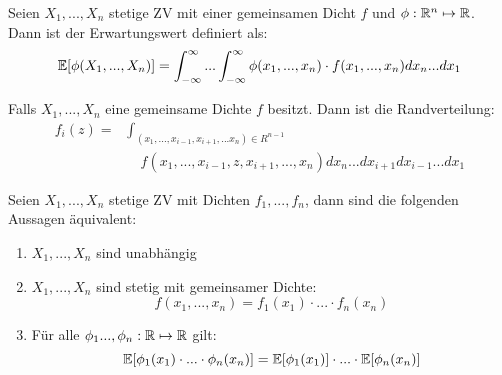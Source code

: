 \begin{subbox}{} Seien $X_1,...,X_n$ stetige ZV mit einer gemeinsamen Dicht $f$ und $\phi: \mathbb{R}^n \mapsto \mathbb{R}$. Dann ist der Erwartungswert definiert als:
$$\mathbb{E}[\phi(X_1, ..., X_n)] = \int_{-\infty}^\infty ... \int_{-\infty}^\infty \phi(x_1, ...,x_n) \cdot f(x_1,...,x_n) dx_n...dx_1$$
\end{subbox}
\begin{subbox}{} Falls $X_1,...,X_n$ eine gemeinsame Dichte $f$ besitzt. Dann ist die Randverteilung:
\begin{align*}
    f_i(z) =& \int_{(x_1, ..., x_{i-1},x_{i+1},...x_n) \in R^{n-1}} \\ 
    & \quad f(x_1,...,x_{i-1},z,x_{i+1},...,x_n)dx_n...dx_{i+1}dx_{i-1}...dx_1
\end{align*}
\end{subbox}
\begin{subbox}{} Seien $X_1,...,X_n$ stetige ZV mit Dichten $f_1,..., f_n$, dann sind die folgenden Aussagen äquivalent:
\begin{enumerate}
    \item $X_1,...,X_n$ sind unabhängig
    
    \item $X_1,...,X_n$ sind stetig mit gemeinsamer Dichte: 
    $$f(x_1,...,x_n) = f_1(x_1) \cdot ... \cdot f_n(x_n)$$
    
    \item Für alle $\phi_1...,\phi_n : \mathbb{R} \mapsto \mathbb{R}$ gilt:
    $$\mathbb{E}[\phi_1(x_1) \cdot ... \cdot \phi_n(x_n)] = \mathbb{E}[\phi_1(x_1)] \cdot ... \cdot \mathbb{E}[\phi_n(x_n)]$$
\end{enumerate}\end{subbox}